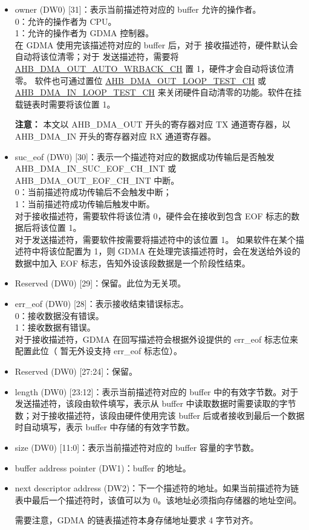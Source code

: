 \documentclass[main\_\_CN.tex]{subfiles}
\begin{document}
\begin{itemize}
    \item owner (DW0) [31]：表示当前描述符对应的 buffer 允许的操作者。\\
    0：允许的操作者为 CPU。\\
    1：允许的操作者为 GDMA 控制器。\\
    在 GDMA 使用完该描述符对应的 buffer 后，对于 接收描述符，硬件默认会自动将该位清零；对于 发送描述符，需要将 \hyperref[fielddesc:AHBDMAOUTAUTOWRBACKCHN]{AHB\_DMA\_OUT\_AUTO\_WRBACK\_CH} 置 1，硬件才会自动将该位清零。 软件也可通过置位 \hyperref[fielddesc:AHBDMAOUTLOOPTESTCHN]{AHB\_DMA\_OUT\_LOOP\_TEST\_CH} 或 \hyperref[fielddesc:AHBDMAINLOOPTESTCHN]{AHB\_DMA\_IN\_LOOP\_TEST\_CH} 来关闭硬件自动清零的功能。软件在挂载链表时需要将该位置 1。

    {\bfseries 注意： } 本文以 AHB\_DMA\_OUT 开头的寄存器对应 TX 通道寄存器，以 AHB\_DMA\_IN 开头的寄存器对应 RX 通道寄存器。
    \item suc\_eof (DW0) [30]：表示一个描述符对应的数据成功传输后是否触发 AHB\_DMA\_IN\_SUC\_EOF\_CH\_INT 或 AHB\_DMA\_OUT\_EOF\_CH\_INT 中断。\\
    0：当前描述符成功传输后不会触发中断；\\
    1：当前描述符成功传输后触发中断。\\
    对于接收描述符，需要软件将该位清 0，硬件会在接收到包含 EOF 标志的数据后将该位置 1。\\对于发送描述符，需要软件按需要将描述符中的该位置 1。
    如果软件在某个描述符中将该位配置为 1，则 GDMA 在处理完该描述符时，会在发送给外设的数据中加入 EOF 标志，告知外设该段数据是一个阶段性结束。
    \item Reserved (DW0) [29]：保留。此位为无关项。
    \item err\_eof (DW0) [28]：表示接收结束错误标志。\\
    0：接收数据没有错误。\\
    1：接收数据有错误。\\
    对于接收描述符，GDMA 在回写描述符会根据外设提供的 err\_eof 标志位来配置此位（\chipname{} 暂无外设支持 err\_eof 标志位）。
    \item Reserved (DW0) [27:24]：保留。
    \item length (DW0) [23:12]：表示当前描述符对应的 buffer 中的有效字节数。对于发送描述符，该段由软件填写，表示从 buffer 中读取数据时需要读取的字节数；对于接收描述符，该段由硬件使用完该 buffer 后或者接收到最后一个数据时自动填写，表示 buffer 中存储的有效字节数。
    \item size (DW0) [11:0]：表示当前描述符对应的 buffer 容量的字节数。
    \item buffer address pointer (DW1)：buffer 的地址。
    \item next descriptor address (DW2)：下一个描述符的地址。如果当前描述符为链表中最后一个描述符时，该值可以为 0。该地址必须指向存储器的地址空间。
    \begin{tiplisting}
        需要注意，GDMA 的链表描述符本身存储地址要求 4 字节对齐。
    \end{tiplisting}
\end{itemize}
\end{document}
